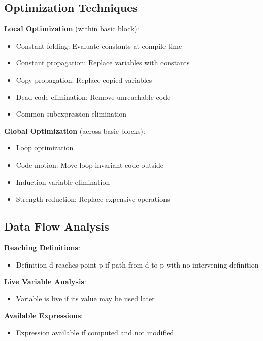 \documentclass[12pt,a4paper]{report}
\begin{document}
\subsection{Optimization Techniques}
\begin{concept}
\textbf{Local Optimization} (within basic block):
\begin{itemize}
    \item Constant folding: Evaluate constants at compile time
    \item Constant propagation: Replace variables with constants
    \item Copy propagation: Replace copied variables
    \item Dead code elimination: Remove unreachable code
    \item Common subexpression elimination
\end{itemize}

\textbf{Global Optimization} (across basic blocks):
\begin{itemize}
    \item Loop optimization
    \item Code motion: Move loop-invariant code outside
    \item Induction variable elimination
    \item Strength reduction: Replace expensive operations
\end{itemize}
\end{concept}

\subsection{Data Flow Analysis}
\begin{concept}
\textbf{Reaching Definitions}:
\begin{itemize}
    \item Definition d reaches point p if path from d to p with no intervening definition
\end{itemize}

\textbf{Live Variable Analysis}:
\begin{itemize}
    \item Variable is live if its value may be used later
\end{itemize}

\textbf{Available Expressions}:
\begin{itemize}
    \item Expression available if computed and not modified
\end{itemize}
\end{concept}
\end{document}
